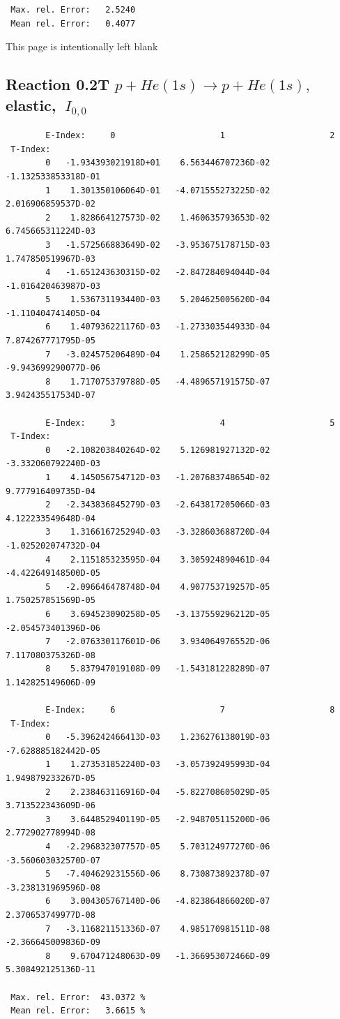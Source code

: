 \documentclass[12pt,dvips]{article}
\begin{document}
\begin{small}
\begin{verbatim}
 Max. rel. Error:   2.5240
 Mean rel. Error:   0.4077
\end{verbatim}\end{small}

\newpage
This page is intentionally left blank
\newpage

\subsection{
Reaction 0.2T $ p + He(1s) \rightarrow p + He(1s) ,\  $
elastic, $ \  I_{0,0} $
}

\begin{small}\begin{verbatim}
        E-Index:     0                     1                     2
 T-Index:
        0   -1.934393021918D+01    6.563446707236D-02   -1.132533853318D-01
        1    1.301350106064D-01   -4.071555273225D-02    2.016906859537D-02
        2    1.828664127573D-02    1.460635793653D-02    6.745665311224D-03
        3   -1.572566883649D-02   -3.953675178715D-03    1.747850519967D-03
        4   -1.651243630315D-02   -2.847284094044D-04   -1.016420463987D-03
        5    1.536731193440D-03    5.204625005620D-04   -1.110404741405D-04
        6    1.407936221176D-03   -1.273303544933D-04    7.874267771795D-05
        7   -3.024575206489D-04    1.258652128299D-05   -9.943699290077D-06
        8    1.717075379788D-05   -4.489657191575D-07    3.942435517534D-07

        E-Index:     3                     4                     5
 T-Index:
        0   -2.108203840264D-02    5.126981927132D-02   -3.332060792240D-03
        1    4.145056754712D-03   -1.207683748654D-02    9.777916409735D-04
        2   -2.343836845279D-03   -2.643817205066D-03    4.122233549648D-04
        3    1.316616725294D-03   -3.328603688720D-04   -1.025202074732D-04
        4    2.115185323595D-04    3.305924890461D-04   -4.422649148500D-05
        5   -2.096646478748D-04    4.907753719257D-05    1.750257851569D-05
        6    3.694523090258D-05   -3.137559296212D-05   -2.054573401396D-06
        7   -2.076330117601D-06    3.934064976552D-06    7.117080375326D-08
        8    5.837947019108D-09   -1.543181228289D-07    1.142825149606D-09

        E-Index:     6                     7                     8
 T-Index:
        0   -5.396242466413D-03    1.236276138019D-03   -7.628885182442D-05
        1    1.273531852240D-03   -3.057392495993D-04    1.949879233267D-05
        2    2.238463116916D-04   -5.822708605029D-05    3.713522343609D-06
        3    3.644852940119D-05   -2.948705115200D-06    2.772902778994D-08
        4   -2.296832307757D-05    5.703124977270D-06   -3.560603032570D-07
        5   -7.404629231556D-06    8.730873892378D-07   -3.238131969596D-08
        6    3.004305767140D-06   -4.823864866020D-07    2.370653749977D-08
        7   -3.116821151336D-07    4.985170981511D-08   -2.366645009836D-09
        8    9.670471248063D-09   -1.366953072466D-09    5.308492125136D-11

 Max. rel. Error:  43.0372 %
 Mean rel. Error:   3.6615 %

\end{verbatim}\end{small}
\end{document}
